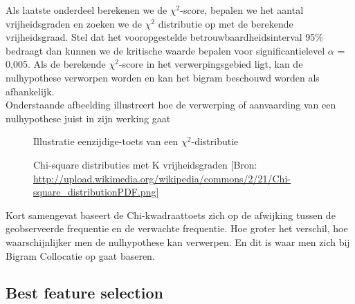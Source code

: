 Als laatste onderdeel berekenen we de ${\chi}^2$-score, bepalen we het aantal vrijheidsgraden en zoeken we de ${\chi}^2$ distributie op met de berekende vrijheidsgraad. Stel dat het vooropgestelde betrouwbaardheidsinterval 95\% bedraagt dan kunnen we de kritische waarde bepalen voor significantielevel $\alpha$ = 0,005.
Als de berekende ${\chi}^2$-score in het verwerpingsgebied ligt, kan de nulhypothese verworpen worden en kan het bigram beschouwd worden als afhankelijk.\\
%
Onderstaande afbeelding illustreert hoe de verwerping of aanvaarding van een nulhypothese juist in zijn werking gaat
%
\begin{figure}%
    \centering
    \caption{Illustratie eenzijdige-toets van een ${\chi}^2$-distributie}%
    \qquad
    \caption{Chi-square distributies met K vrijheidsgraden [Bron: \url{http://upload.wikimedia.org/wikipedia/commons/2/21/Chi-square_distributionPDF.png}]}%
    \label{fig:example}%
\end{figure}
%  
Kort samengevat baseert de Chi-kwadraattoets zich op de afwijking tussen de geobserveerde frequentie en de verwachte frequentie. Hoe groter het verschil, hoe waarschijnlijker men de nulhypothese kan verwerpen. En dit is waar men zich bij Bigram Collocatie op gaat baseren.

\subsection{Best feature selection}\label{Low-information feature el}

